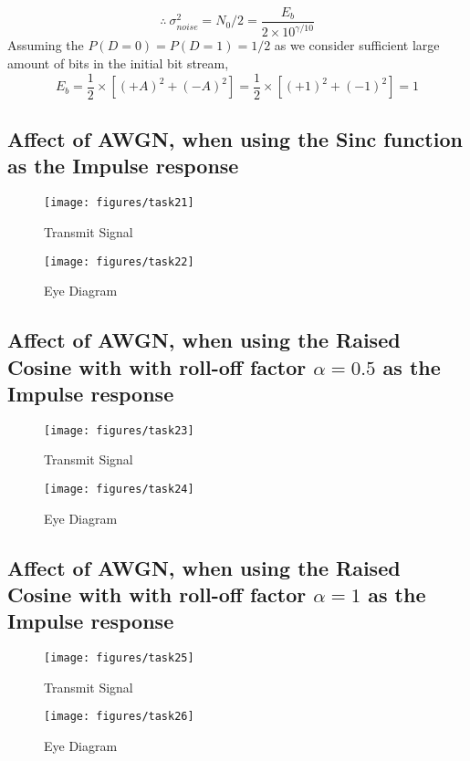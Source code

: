 \documentclass[a4paper,11pt]{article}%
\begin{document}
\[\therefore ~\sigma_{noise}^2 = N_0/2 = \frac{E_b}{2 \times 10^{\gamma/10}}  \]
Assuming the $P(D = 0) = P(D = 1) = 1/2$ as we consider sufficient large amount of bits in the initial bit stream,
\[
E_b = \frac{1}{2} \times \left[ (+A)^2 + (-A)^2 \right]
 = \frac{1}{2} \times \left[ (+1)^2 + (-1)^2 \right]
 = 1
\]
\pagebreak
\subsection{Affect of AWGN, when using the Sinc function as the Impulse response}

\begin{figure}[H]
	\centering
	\texttt{[image: figures/task21]}
	\caption{Transmit Signal}
\end{figure}

\begin{figure}[H]
	\centering
	\texttt{[image: figures/task22]}
	\caption{Eye Diagram}
\end{figure}

\pagebreak
\subsection{Affect of AWGN, when using the Raised Cosine with with roll-off factor $\alpha = 0.5$ as the Impulse response}

\begin{figure}[H]
	\centering
	\texttt{[image: figures/task23]}
	\caption{Transmit Signal}
\end{figure}

\begin{figure}[H]
	\centering
	\texttt{[image: figures/task24]}
	\caption{Eye Diagram}
\end{figure}


\pagebreak
\subsection{Affect of AWGN, when using the Raised Cosine with with roll-off factor $\alpha = 1$ as the Impulse response}

\begin{figure}[H]
	\centering
	\texttt{[image: figures/task25]}
	\caption{Transmit Signal}
\end{figure}

\begin{figure}[H]
	\centering
	\texttt{[image: figures/task26]}
	\caption{Eye Diagram}
\end{figure}
\end{document}

